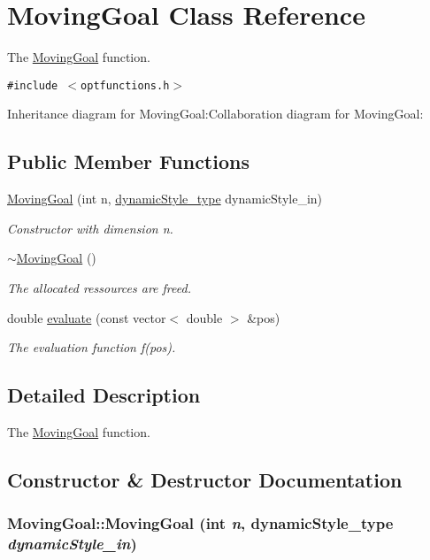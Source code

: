 \hypertarget{classMovingGoal}{
\section{MovingGoal Class Reference}
\label{classMovingGoal}
}
The \hyperlink{classMovingGoal}{MovingGoal} function.  


{\tt \#include $<$optfunctions.h$>$}

Inheritance diagram for MovingGoal:Collaboration diagram for MovingGoal:\subsection*{Public Member Functions}
\begin{CompactItemize}
\item 
\hyperlink{classMovingGoal_e6b04c71f43ea3f216679b0f6eada8cd}{MovingGoal} (int n, \hyperlink{optfunctions_8h_ae9aa3a5dd199a43e77abc2cccf4477e}{dynamicStyle\_\-type} dynamicStyle\_\-in)
\begin{CompactList}\small\item\em Constructor with dimension n. \item\end{CompactList}\item 
\hyperlink{classMovingGoal_482ed4706f4651bb1768ad29a6be0dc9}{$\sim$MovingGoal} ()
\begin{CompactList}\small\item\em The allocated ressources are freed. \item\end{CompactList}\item 
double \hyperlink{classMovingGoal_495b2d42c272fb2a941792e67c8c79c4}{evaluate} (const vector$<$ double $>$ \&pos)
\begin{CompactList}\small\item\em The evaluation function f(pos). \item\end{CompactList}\end{CompactItemize}


\subsection{Detailed Description}
The \hyperlink{classMovingGoal}{MovingGoal} function. 

\subsection{Constructor \& Destructor Documentation}
\hypertarget{classMovingGoal_e6b04c71f43ea3f216679b0f6eada8cd}{
\subsubsection{\setlength{\rightskip}{0pt plus 5cm}MovingGoal::MovingGoal (int {\em n}, \/  {\bf dynamicStyle\_\-type} {\em dynamicStyle\_\-in})}}
\label{classMovingGoal_e6b04c71f43ea3f216679b0f6eada8cd}


